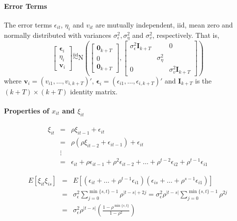 \documentclass[12pt]{article}
\begin{document}
\paragraph{Error Terms}
The error terms $\epsilon_{it}$, $\eta_i$ and $v_{it}$ are mutually independent, iid, mean zero and normally distributed with variances $\sigma_\epsilon^2, \sigma_\eta^2$ and $\sigma_v^2$, respectively. That is,
  $$\left[ \begin{array}{c} \boldsymbol{\epsilon}_i \\ \eta_i \\ \boldsymbol{v}_i \end{array} \right] \overset{\mbox{iid}}{\sim} \mbox{N}\left(
  \left[ \begin{array}{l}
    \mathbf{0}_{k+T}\\
    0\\
    \mathbf{0}_{k+T}
  \end{array}\right], 
  \left[ \begin{array}{ccc}
    \sigma_\epsilon^2 \mathbf{I}_{k+T}&&0 \\
    &\sigma_\eta^2& \\
    0&&\sigma_v^2 \mathbf{I}_{k+T}
  \end{array}\right]
  \right)$$
where $\mathbf{v}_i = (v_{i1}, \hdots, v_{i,k+T})'$, $\boldsymbol{\epsilon}_i = (\epsilon_{i1}, \hdots, \epsilon_{i,k+T})'$ and $\mathbf{I}_{k+T}$ is the $(k+T)\times(k+T)$ identity matrix.

\paragraph{Properties of $x_{it}$ and $\xi_{it}$}
\begin{eqnarray*}
  \xi_{it} &=& \rho \xi_{it-1} + \epsilon_{it}\\
    &=& \rho(\rho \xi_{it-2} + \epsilon_{it-1}) + \epsilon_{it}\\
    &\vdots&\\
    &=& \epsilon_{it} + \rho \epsilon_{it-1} +\rho^2 \epsilon_{it-2} + \hdots + \rho^{t-2}\epsilon_{i2} + \rho^{t-1}\epsilon_{i1}
\end{eqnarray*}


\begin{eqnarray*}
  E[\xi_{it}\xi_{is}] &=& E\left[ \left(\epsilon_{it} + \hdots +  \rho^{t-1}\epsilon_{i1}\right) \left(\epsilon_{is} + \hdots +  \rho^{s-1}\epsilon_{i1}\right) \right]\\
    &=& \sigma_\epsilon^2 \sum_{j=0}^{\min\{s,t \}-1} \rho^{|t-s| + 2j} = \sigma_\epsilon^2 \rho^{|t-s|} \sum_{j=0}^{\min\{s,t \}-1} \rho^{ 2j}\\
  &=&  \sigma_\epsilon^2 \rho^{|t-s|}\left(\frac{1 - \rho^{\min\{s,t\}}}{1-\rho^2} \right)
\end{eqnarray*}
\end{document}
